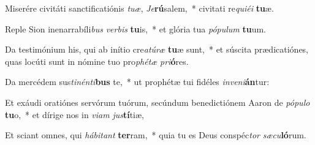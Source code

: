 \item Miserére civitáti sanctificatiónis \textit{tu}\textit{æ}, \textit{Je}\textbf{rú}salem,~* civitati re\textit{qui}\textit{é}\textit{i} \textbf{tu}æ.
\item Reple Sion inenarrabíli\textit{bus} \textit{ver}\textit{bis} \textbf{tu}is,~* et glória tua \textit{pó}\textit{pu}\textit{lum} \textbf{tu}um.
\item Da testimónium his, qui ab inítio cre\textit{a}\textit{tú}\textit{ræ} \textbf{tu}æ sunt,~* et súscita prædicatiónes, quas locúti sunt in nómine tuo pro\textit{phé}\textit{tæ} \textit{pri}\textbf{ó}res.
\item Da mercédem sus\textit{ti}\textit{nén}\textit{ti}\textbf{bus} te,~* ut prophétæ tui fidéles \textit{in}\textit{ve}\textit{ni}\textbf{án}tur:
\item Et exáudi oratiónes servórum tuórum, secúndum benedictiónem Aaron de \textit{pó}\textit{pu}\textit{lo} \textbf{tu}o,~* et dírige nos in \textit{vi}\textit{am} \textit{jus}\textbf{tí}tiæ,
\item Et sciant omnes, qui \textit{há}\textit{bi}\textit{tant} \textbf{ter}ram,~* quia tu es Deus conspéc\textit{tor} \textit{sæ}\textit{cu}\textbf{ló}rum.

